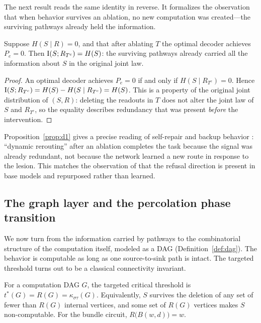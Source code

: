 The next result reads the same identity in reverse. It formalizes the observation that
when behavior survives an ablation, no new computation was created---the surviving
pathways already held the information.

\begin{proposition}
\label{prop:d1}
Suppose $H(S\mid R)=0$, and that after ablating $T$ the optimal decoder achieves
$P_e=0$. Then $\operatorname{I}(S;R_{T^c})=H(S)$: the surviving pathways already carried all the
information about $S$ in the original joint law.
\end{proposition}

\begin{proof}
An optimal decoder achieves $P_e=0$ if and only if $H(S\mid R_{T^c})=0$. Hence
$\operatorname{I}(S;R_{T^c})=H(S)-H(S\mid R_{T^c})=H(S)$. This is a property of the original joint
distribution of $(S,R)$: deleting the readouts in $T$ does not alter the joint law of
$S$ and $R_{T^c}$, so the equality describes redundancy that was present \emph{before}
the intervention.
\end{proof}

\begin{remark}
Proposition~\ref{prop:d1} gives a precise reading of self-repair and backup behavior
\cite{wang2022ioi,mcgrath2023hydra,joad2026directions}: ``dynamic rerouting'' after an
ablation completes the task because the signal was already redundant, not because the
network learned a new route in response to the lesion. This matches the observation of
\cite{arditi2024refusal} that the refusal direction is present in base models and
repurposed rather than learned.
\end{remark}

\subsection{The graph layer and the percolation phase transition}
\label{subsec:graph}

We now turn from the information carried by pathways to the combinatorial structure of
the computation itself, modeled as a DAG (Definition~\ref{def:dag}). The behavior is
computable as long as one source-to-sink path is intact. The targeted threshold turns
out to be a classical connectivity invariant.

\begin{theorem}
\label{thm:c1}
For a computation DAG $G$, the targeted critical threshold is
$t^*(G)=R(G)=\kappa_{\sigma\tau}(G)$. Equivalently, $S$ survives the deletion of any
set of fewer than $R(G)$ internal vertices, and some set of $R(G)$ vertices makes $S$
non-computable. For the bundle circuit, $R\bigl(B(w,d)\bigr)=w$.
\end{theorem}

